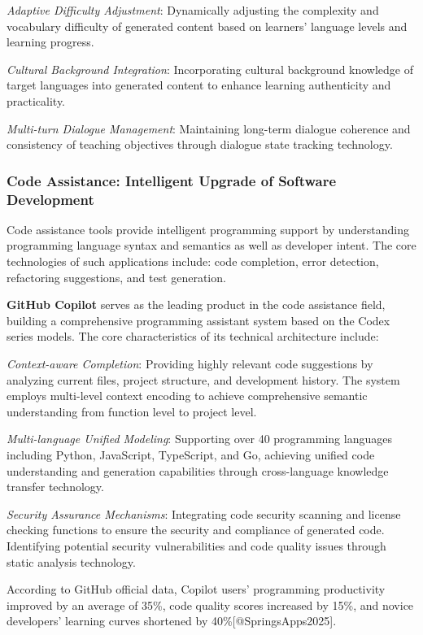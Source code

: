 \documentclass{article}
\begin{document}
\textit{Adaptive Difficulty Adjustment}: Dynamically adjusting the complexity and vocabulary difficulty of generated content based on learners' language levels and learning progress.

\textit{Cultural Background Integration}: Incorporating cultural background knowledge of target languages into generated content to enhance learning authenticity and practicality.

\textit{Multi-turn Dialogue Management}: Maintaining long-term dialogue coherence and consistency of teaching objectives through dialogue state tracking technology.

\subsubsection{Code Assistance: Intelligent Upgrade of Software Development}
Code assistance tools provide intelligent programming support by understanding programming language syntax and semantics as well as developer intent. The core technologies of such applications include: code completion, error detection, refactoring suggestions, and test generation.

\textbf{GitHub Copilot} serves as the leading product in the code assistance field, building a comprehensive programming assistant system based on the Codex series models. The core characteristics of its technical architecture include:

\textit{Context-aware Completion}: Providing highly relevant code suggestions by analyzing current files, project structure, and development history. The system employs multi-level context encoding to achieve comprehensive semantic understanding from function level to project level.

\textit{Multi-language Unified Modeling}: Supporting over 40 programming languages including Python, JavaScript, TypeScript, and Go, achieving unified code understanding and generation capabilities through cross-language knowledge transfer technology.

\textit{Security Assurance Mechanisms}: Integrating code security scanning and license checking functions to ensure the security and compliance of generated code. Identifying potential security vulnerabilities and code quality issues through static analysis technology.

According to GitHub official data, Copilot users' programming productivity improved by an average of 35\%, code quality scores increased by 15\%, and novice developers' learning curves shortened by 40\%[@SpringsApps2025].
\end{document}
